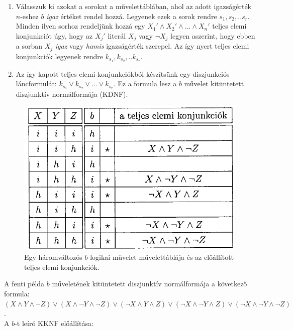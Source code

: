 \documentclass[margin=0px]{article}
\begin{document}
\begin{enumerate}
    \item	Válasszuk ki azokat a sorokat a művelettáblában, ahol az adott igazságérték $n$-eshez $b$ \textit{igaz}
          értéket rendel hozzá. Legyenek ezek a sorok rendre $s_{1}, s_{2}, .. s_{r}$. Minden ilyen sorhoz rendeljünk
          hozzá egy $X_{1}' \wedge X_{2}' \wedge ... \wedge X_{n}'$ teljes elemi konjunkciót úgy, hogy az $X_{j}'$ literál
          $X_{j}$ vagy $\neg X_{j}$ legyen aszerint, hogy ebben a sorban $X_{j}$ \textit{igaz} vagy \textit{hamis} igazságérték
          szerepel. Az így nyert teljes elemi konjunkciók legyenek rendre $k_{s_{1}}, k_{s_{2}}, .. k_{s_{r}}$.

    \item	Az így kapott teljes elemi konjunkciókból készítsünk egy diszjunkciós láncformulát:
          $k_{s_{1}} \vee k_{s_{2}} \vee ... \vee k_{s_{r}}$. Ez a formula lesz a $b$ művelet kitüntetett diszjunktív
          normálformája (KDNF).
\end{enumerate}

\begin{figure}[H]
    \centering
    \includegraphics[width=0.5\linewidth]{img/kdnf_pelda}
    \caption{Egy háromváltozós $b$ logikai művelet művelettáblája és az előállított teljes elemi konjunkciók.}
    \label{fig:kdnf_pelda}
\end{figure}

A fenti példa $b$ műveletének kitüntetett diszjunktív normálformája a következő formula:\\
$(X \wedge Y \wedge \neg Z) \vee (X \wedge \neg Y \wedge \neg Z) \vee (\neg X \wedge Y \wedge Z) \vee (\neg X \wedge \neg Y \wedge Z) \vee (\neg X \wedge \neg Y \wedge \neg Z)$.\\

\noindent A $b$-t leíró KKNF előállítása:
\end{document}
